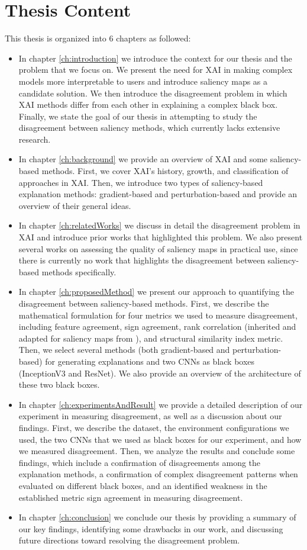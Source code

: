 \section{Thesis Content}
\label{sec:thesisContent}
This thesis is organized into 6 chapters as followed:
\begin{itemize}
    \item In chapter \ref{ch:introduction} we introduce the context for our thesis and the problem that we focus on. We present the need for XAI in making complex models more interpretable to users and introduce saliency maps as a candidate solution. We then introduce the disagreement problem in which XAI methods differ from each other in explaining a complex black box. Finally, we state the goal of our thesis in attempting to study the disagreement between saliency methods, which currently lacks extensive research.
    \item In chapter \ref{ch:background} we provide an overview of XAI and some saliency-based methods. First, we cover XAI's history, growth, and classification of approaches in XAI. Then, we introduce two types of saliency-based explanation methods: gradient-based and perturbation-based and provide an overview of their general ideas.
    \item In chapter \ref{ch:relatedWorks} we discuss in detail the disagreement problem in XAI and introduce prior works that highlighted this problem. We also present several works on assessing the quality of saliency maps in practical use, since there is currently no work that highlights the disagreement between saliency-based methods specifically.
    \item In chapter \ref{ch:proposedMethod} we present our approach to quantifying the disagreement between saliency-based methods. First, we describe the mathematical formulation for four metrics we used to measure disagreement, including feature agreement, sign agreement, rank correlation (inherited and adapted for saliency maps from \cite{krishna_disagreement_problem}), and structural similarity index metric. Then, we select several methods (both gradient-based and perturbation-based) for generating explanations and two CNNs as black boxes (InceptionV3 and ResNet). We also provide an overview of the architecture of these two black boxes.
    \item In chapter \ref{ch:experimentsAndResult} we provide a detailed description of our experiment in measuring disagreement, as well as a discussion about our findings. First, we describe the dataset, the environment configurations we used, the two CNNs that we used as black boxes for our experiment, and how we measured disagreement. Then, we analyze the results and conclude some findings, which include a confirmation of disagreements among the explanation methods, a confirmation of complex disagreement patterns when evaluated on different black boxes, and an identified weakness in the established metric sign agreement in measuring disagreement.
    \item In chapter \ref{ch:conclusion} we conclude our thesis by providing a summary of our key findings, identifying some drawbacks in our work, and discussing future directions toward resolving the disagreement problem.
\end{itemize}